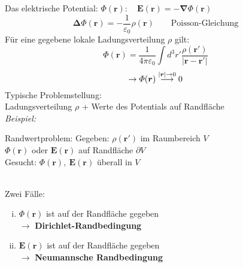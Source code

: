 \documentclass[titlepage,11pt,a4paper,ngerman]{report}
\newcommand{\tx}[1]{\textrm{#1}}
\renewcommand{\Phi}{\varPhi}
\renewcommand{\vec}[1]{\boldsymbol{#1}}
\renewcommand{\epsilon}{\varepsilon}
\newcommand{\bei}{\emph{Beispiel: }}
\begin{document}
Das elektrische Potential: $ \Phi(\vec{r}): \quad \vec{E}(\vec{r}) = - \vec{\nabla} \Phi(\vec{r}) $\\
$$ \vec{\Delta} \Phi (\vec{r}) = -\frac{1}{\epsilon_0} \rho(\vec{r})  \qquad \tx{Poisson-Gleichung}$$
Für eine gegebene lokale Ladungsverteilung $ \rho $ gilt:
\begin{equation*}
\Phi(\vec{r}) = \frac{1}{4 \pi \epsilon_0} \int d^3 r' \frac{\rho(\vec{r}')}{|\vec{r} - \vec{r}'|}
\end{equation*}
\begin{equation*}
\rightarrow \Phi(\vec{r}) \buildrel |\vec{r}| \rightarrow 0 \over \longrightarrow 0
\end{equation*}
Typische Problemstellung:\\
Ladungsverteilung $\rho$ + Werte des Potentials auf Randfläche\\[5pt]
\bei\\
\begin{minipage}{.6\linewidth}
	Randwertproblem: Gegeben: $\rho(\vec{r}')$ im Raumbereich $V$\\
	$\Phi(\vec{r})$ oder $\vec{E}(\vec{r})$ auf Randfläche $\partial V$\\
	Gesucht: $\Phi(\vec{r}),\ \vec{E}(\vec{r})$ überall in $V$
\end{minipage}%
\begin{minipage}{.4\linewidth}
	\centering
\end{minipage}%
\\
Zwei Fälle:
\begin{enumerate}[i)]
	\item $ \Phi(\vec{r}) $ ist auf der Randfläche gegeben\\
	$ \rightarrow $ \textbf{Dirichlet-Randbedingung}
	\item $ \vec{E}(\vec{r}) $ ist auf der Randfläche gegeben\\
	$ \rightarrow $ \textbf{Neumannsche Randbedingung}
\end{enumerate}
\end{document}
